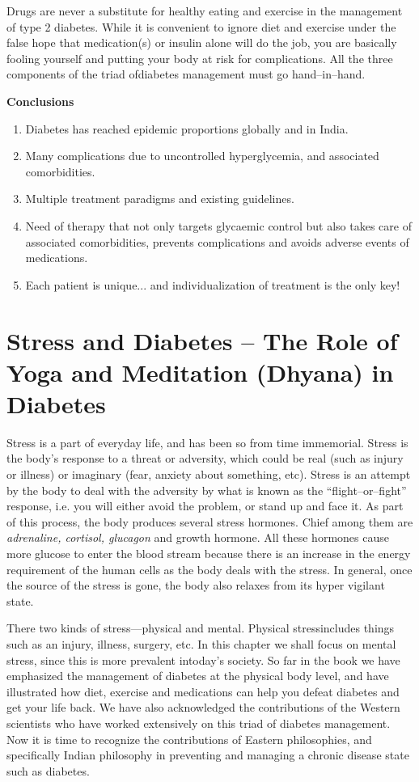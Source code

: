 Drugs are never a substitute for healthy eating and exercise in the management of type 2 diabetes. While it is convenient to ignore diet and exercise under the false hope that medication(s) or insulin alone will do the job, you are basically fooling yourself and putting your body at risk for complications. All the three components of the triad of\break diabetes management must go hand–in–hand.

\vskip 6pt

\noindent\textbf{Conclusions}

\begin{enumerate}[•]
\itemsep=0pt
\item Diabetes has reached epidemic proportions globally and in India.
\item Many complications due to uncontrolled hyperglycemia, and asso\-ciated comorbidities.
\item Multiple treatment paradigms and existing guidelines.
\item Need of therapy that not only targets glycaemic control but also takes care of associated comorbidities, prevents complications and avoids adverse events of medications.
\item Each patient is unique... and individualization of treatment is the only key!
\end{enumerate}


\chapter{Stress and Diabetes – The Role of Yoga and Meditation (Dhyana) in Diabetes}\label{chap27}

Stress is a part of everyday life, and has been so from time immemorial. Stress is the body’s response to a threat or adversity, which could be real (such as injury or illness) or imaginary (fear, anxiety about something, etc). Stress is an attempt by the body to deal with the adversity by what is known as the “flight–or–fight” response, i.e. you will either avoid the problem, or stand up and face it. As part of this process, the body produces several stress hormones. Chief among them are \textit{adrenaline, cortisol, glucagon} and growth hormone. All these hormones cause more glucose to enter the blood stream because there is an increase in the energy requirement of the human cells as the body deals with the stress. In general, once the source of the stress is gone, the body also relaxes from its hyper vigilant state.

There two kinds of stress—physical and mental. Physical stress\break includes things such as an injury, illness, surgery, etc. In this chapter we shall focus on mental stress, since this is more prevalent in\break today’s society. So far in the book we have emphasized the management of diabetes at the physical body level, and have illustrated how diet, exercise and medications can help you defeat diabetes and get your life back. We have also acknowledged the contributions of the Western scientists who have worked extensively on this triad of diabetes management. Now it is time to recognize the contributions of Eastern philosophies, and specifically Indian philosophy in preventing and managing a chronic disease state such as diabetes.

